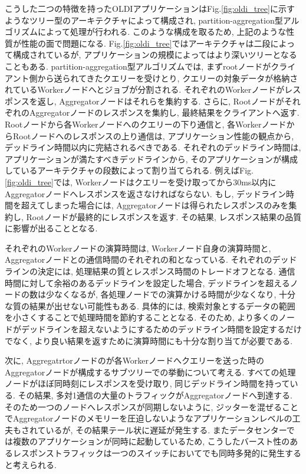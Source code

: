 こうした二つの特徴を持ったOLDIアプリケーションはFig.\ref{fig:oldi_tree}に示すようなツリー型のアーキテクチャによって構成され,
partition-aggregation型アルゴリズムによって処理が行われる. 
このような構成を取るため, 上記のような性質が性能の面で問題になる.\cite{websearch} 
Fig.\ref{fig:oldi_tree}ではアーキテクチャは二段によって構成されているが,
アプリケーションの規模によってはより深いツリーとなることもある. 
partition-aggregation型アルゴリズムでは, まずrootノードがクライアント側から送られてきたクエリーを受けとり,
クエリーの対象データが格納されているWorkerノードへとジョブが分割される. 
それぞれのWorkerノードがレスポンスを返し, Aggregatorノードはそれらを集約する. 
さらに, RootノードがそれぞれのAggregatorノードのレスポンスを集約し, 最終結果をクライアントへ返す. 
Rootノードから各Workerノードへのクエリーの下り通信と, 各WorkerノードからRootノードへのレスポンスの上り通信は,
アプリケーション性能の観点から, デッドライン時間以内に完結されるべきである. 
それぞれのデッドライン時間は, アプリケーションが満たすべきデッドラインから, そのアプリケーションが構成しているアーキテクチャの段数によって割り当てられる. 
例えばFig.\ref{fig:oldi_tree}では,
Workerノードはクエリーを受け取ってから30ms以内にAggregatorノードへレスポンスを返さなければならない. 
もし, デッドライン時間を超えてしまった場合には, Aggregatorノードは得られたレスポンスのみを集約し, Rootノードが最終的にレスポンスを返す. 
その結果, レスポンス結果の品質に影響が出ることとなる. 

それぞれのWorkerノードの演算時間は,  Workerノード自身の演算時間と, Aggregatorノードとの通信時間のそれぞれの和となっている. 
それぞれのデッドラインの決定には, 処理結果の質とレスポンス時間のトレードオフとなる. 
通信時間に対して余裕のあるデッドラインを設定した場合, デッドラインを超えるノードの数は少なくなるが, 各処理ノードでの演算かける時間が少なくなり,
十分な質の結果が出せない可能性もある. 
具体的には, 検索対象とするデータの範囲を小さくすることで処理時間を節約することとなる. 
そのため,  より多くのノードがデッドラインを超えないようにするためのデッドライン時間を設定するだけでなく,
より良い結果を返すために演算時間にも十分な割り当てが必要である.\cite{d2tcp} 

次に, Aggregatrtorノードのが各Workerノードへクエリーを送った時のAggregatorノードが構成するサブツリーでの挙動について考える. 
すべての処理ノードがほぼ同時刻にレスポンスを受け取り, 同じデッドライン時間を持っている. 
その結果, 多対1通信の大量のトラフィックがAggregatorノードへ到達する\cite{dctcp, incast}. 
そのため一つのノードへレスポンスが同期しないように,
ジッターを混ぜることでAggregatorノードのメモリーを圧迫しないようなアプリケーションレベルの工夫もされているが,
その結果テール状に遅延が発生する\cite{desynchro}.
またデータセンターでは複数のアプリケーションが同時に起動しているため,
こうしたバースト性のあるレスポンストラフィックは一つのスイッチにおいてでも同時多発的に発生すると考えられる.

